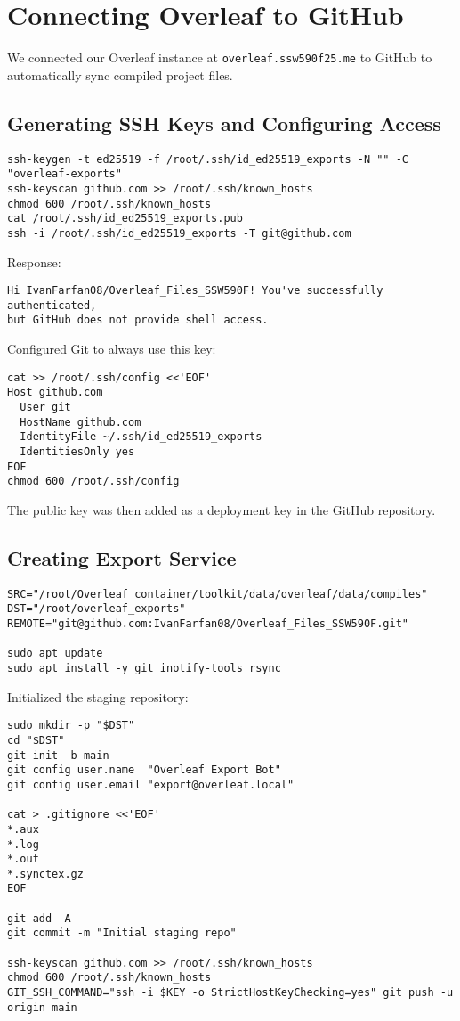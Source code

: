 \section{Connecting Overleaf to GitHub}

We connected our Overleaf instance at \texttt{overleaf.ssw590f25.me} to GitHub to automatically sync compiled project files.

\subsection*{Generating SSH Keys and Configuring Access}

\begin{verbatim}
ssh-keygen -t ed25519 -f /root/.ssh/id_ed25519_exports -N "" -C "overleaf-exports"
ssh-keyscan github.com >> /root/.ssh/known_hosts
chmod 600 /root/.ssh/known_hosts
cat /root/.ssh/id_ed25519_exports.pub
ssh -i /root/.ssh/id_ed25519_exports -T git@github.com
\end{verbatim}

Response:
\begin{verbatim}
Hi IvanFarfan08/Overleaf_Files_SSW590F! You've successfully authenticated, 
but GitHub does not provide shell access.
\end{verbatim}

Configured Git to always use this key:
\begin{verbatim}
cat >> /root/.ssh/config <<'EOF'
Host github.com
  User git
  HostName github.com
  IdentityFile ~/.ssh/id_ed25519_exports
  IdentitiesOnly yes
EOF
chmod 600 /root/.ssh/config
\end{verbatim}

The public key was then added as a deployment key in the GitHub repository.

\subsection*{Creating Export Service}

\begin{verbatim}
SRC="/root/Overleaf_container/toolkit/data/overleaf/data/compiles"
DST="/root/overleaf_exports"
REMOTE="git@github.com:IvanFarfan08/Overleaf_Files_SSW590F.git"

sudo apt update
sudo apt install -y git inotify-tools rsync
\end{verbatim}

Initialized the staging repository:

\begin{verbatim}
sudo mkdir -p "$DST"
cd "$DST"
git init -b main
git config user.name  "Overleaf Export Bot"
git config user.email "export@overleaf.local"

cat > .gitignore <<'EOF'
*.aux
*.log
*.out
*.synctex.gz
EOF

git add -A
git commit -m "Initial staging repo"

ssh-keyscan github.com >> /root/.ssh/known_hosts
chmod 600 /root/.ssh/known_hosts
GIT_SSH_COMMAND="ssh -i $KEY -o StrictHostKeyChecking=yes" git push -u origin main
\end{verbatim}

